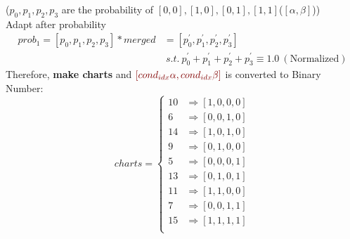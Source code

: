 ($p_0, p_1, p_2, p_3$ are the probability of $[0, 0], [1, 0], [0, 1], [1, 1]$($[\alpha, \beta]$))\\
Adapt after probability
\begin{equation}
    \begin{split}
        prob_1 =[p_0, p_1, p_2, p_3] * merged & = [p_0^{\prime}, p_1^{\prime}, p_2^{\prime}, p_3^{\prime}] \\
        & \ s.t.\ p_0^{\prime} + p_1^{\prime} + p_2^{\prime} + p_3^{\prime} \equiv 1.0 \ (\textrm{Normalized})
    \end{split}
\end{equation}
Therefore, \textbf{make charts} and $\textcolor{darkred}{[cond_{idx}\alpha, cond_{idx}\beta]}$
is converted to Binary Number:
\begin{equation}
    charts =
    \begin{cases}
        10 & \Rightarrow [1, 0, 0, 0] \\
        6 & \Rightarrow [0, 0, 1, 0] \\
        14 & \Rightarrow [1, 0, 1, 0] \\
        9 & \Rightarrow [0, 1, 0, 0] \\
        5 & \Rightarrow [0, 0, 0, 1] \\
        13 & \Rightarrow [0, 1, 0, 1] \\
        11 & \Rightarrow [1, 1, 0, 0] \\
        7 & \Rightarrow [0, 0, 1, 1] \\
        15 & \Rightarrow [1, 1, 1, 1] \\
    \end{cases}
\end{equation}